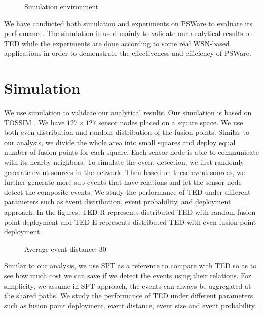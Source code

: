\begin{figure}
\centering
{}
\caption{Simulation environment}
\label{fig:simsetup}
\end{figure}

We have conducted both simulation and experiments on PSWare to evaluate its performance. The simulation is used mainly to validate our analytical results on TED while the experiments are done according to some real WSN-based applications in order to demonstrate the effectiveness and efficiency of PSWare.

\section{Simulation}
\label{sec:simulation}
We use simulation to validate our analytical results. Our simulation is based on TOSSIM \cite{tossim}. We have \(127\times 127\) sensor nodes placed on a square space. We use both even distribution and random distribution of the fusion points. Similar to our analysis, we divide the whole area into small squares and deploy equal number of fusion points for each square. Each sensor node is able to communicate with its nearby neighbors. To simulate the event detection, we first randomly generate event sources in the network. Then based on these event sources, we further generate more sub-events that have relations and let the sensor node detect the composite events. We study the performance of TED under different parameters such as event distribution, event probability, and deployment approach. In the figures, TED-R represents distributed TED with random fusion point deployment and TED-E represents distributed TED with even fusion point deployment.

\begin{figure}
\centering
{}
\caption{Average event distance: 30}
\label{fig:sim-size-distance30}
\end{figure}

Similar to our analysis, we use SPT as a reference to compare with TED so as to see how much cost we can save if we detect the events using their relations. For simplicity, we assume in SPT approach, the events can always be aggregated at the shared paths. We study the performance of TED under different parameters such as fusion point deployment, event distance, event size and event probability.

